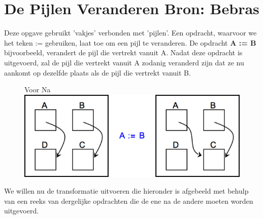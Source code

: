 \documentclass[12pt, a4paper]{article}
\begin{document}
	\begin{minipage}{\textwidth}
		\section{De Pijlen Veranderen \hfill\small Bron: Bebras}
			
			Deze opgave gebruikt 'vakjes' verbonden met 'pijlen'. Een opdracht, waarvoor we het teken := gebruiken, laat toe om een pijl te veranderen. De opdracht \textbf{A := B} bijvoorbeeld, verandert de pijl die vertrekt vanuit A. Nadat deze opdracht is uitgevoerd, zal de pijl die vertrekt vanuit A zodanig veranderd zijn dat ze nu aankomt op dezelfde plaats als de pijl die vertrekt vanuit B.
	
			\begin{figure}[H]
				\centering
				\large
				Voor \hspace{9cm} Na
				\includegraphics[width=\linewidth]{image1} 
			\end{figure}
	
			We willen nu de transformatie uitvoeren die hieronder is afgebeeld met behulp van een reeks van dergelijke opdrachten die de ene na de andere moeten worden uitgevoerd.
		

\end{minipage}
\end{document}
